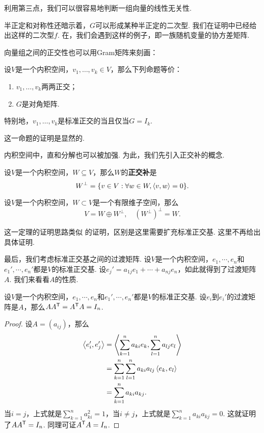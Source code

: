 利用第三点，我们可以很容易地判断一组向量的线性无关性. 

半正定和对称性还暗示着，$G$可以形成某种半正定的二次型. 我们在证明中已经给出这样的二次型$f$. 在，我们会遇到这样的例子，即一族随机变量的协方差矩阵. 

向量组之间的正交性也可以用Gram矩阵来刻画：

\begin{proposition}\label{prop:orthogonal-gram}
设$V$是一个内积空间，$v_1,\dots,v_k\in V$，那么下列命题等价：
\begin{enumerate}
    \item $v_1,\dots,v_k$两两正交；
    \item $G$是对角矩阵. 
\end{enumerate}
特别地，$v_1,\dots,v_k$是标准正交的当且仅当$G=I_k$.
\end{proposition}

这一命题的证明是显然的.

内积空间中，直和分解也可以被加强. 为此，我们先引入正交补的概念. 

\begin{definition}[正交补]\label{def:orthogonal-complement}
设$V$是一个内积空间，$W\subseteq V$，那么$W$的\textbf{正交补}是
\[
    W^\bot=\{v\in V:\forall w\in W,\left\langle{v},{w}\right\rangle=0\}.
\]
\end{definition}

\begin{theorem}\label{prop:orthogonal-complement}
设$V$是一个内积空间，$W\subset V$是一个有限维子空间，那么
\[
    V=W\oplus W^\bot,\quad (W^\bot)^\bot=W.
\]
\end{theorem}

这一定理的证明思路类似 的证明，区别是这里需要扩充标准正交基. 这里不再给出具体证明. 

最后，我们考虑标准正交基之间的过渡矩阵. 设$V$是一个内积空间，$e_1,\cdots,e_n$和$e_1',\cdots,e_n'$都是$V$的标准正交基. 设$e_j'=a_{1j}e_1+\cdots+a_{nj}e_n$，如此就得到了过渡矩阵$A$. 我们来看看$A$的性质. 

\begin{proposition}
设$V$是一个内积空间，$e_1,\cdots,e_n$和$e_1',\cdots,e_n'$都是$V$的标准正交基. 设$e_i$到$e_i'$的过渡矩阵是$A$，那么$AA^{\mathsf{T}}=A^{\mathsf{T}} A=I_n$.
\end{proposition}
\begin{proof}
设$A=(a_{ij})$，那么
\begin{align*}
    \left\langle{e_i'},{e_j'}\right\rangle&=\left\langle{\sum_{k=1}^na_{ki}e_k},{\sum_{l=1}^na_{lj}e_l}\right\rangle \\
    &=\sum_{k=1}^n\sum_{l=1}^na_{ki}a_{lj}\left\langle{e_k},{e_l}\right\rangle \\
    &=\sum_{k=1}^na_{ki}a_{kj}.
\end{align*}
当$i=j$，上式就是$\sum_{k=1}^na_{ki}^2=1$，当$i\neq j$，上式就是$\sum_{k=1}^na_{ki}a_{kj}=0$. 这就证明了$AA^{\mathsf{T}}=I_n$. 同理可证$A^{\mathsf{T}} A=I_n$.
\end{proof}

